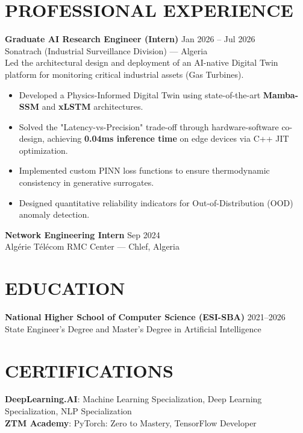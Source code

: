 \documentclass[a4paper,12pt]{article}
\begin{document}
\section{PROFESSIONAL EXPERIENCE}
\textbf{Graduate AI Research Engineer (Intern)} \hfill Jan 2026 -- Jul 2026 \\
Sonatrach (Industrial Surveillance Division) — Algeria \\
Led the architectural design and deployment of an AI-native Digital Twin platform for monitoring critical industrial assets (Gas Turbines). 
\begin{itemize}
    \item Developed a Physics-Informed Digital Twin using state-of-the-art \textbf{Mamba-SSM} and \textbf{xLSTM} architectures.
    \item Solved the "Latency-vs-Precision" trade-off through hardware-software co-design, achieving \textbf{0.04ms inference time} on edge devices via C++ JIT optimization.
    \item Implemented custom PINN loss functions to ensure thermodynamic consistency in generative surrogates.
    \item Designed quantitative reliability indicators for Out-of-Distribution (OOD) anomaly detection.
\end{itemize}

\textbf{Network Engineering Intern} \hfill Sep 2024 \\
Algérie Télécom RMC Center — Chlef, Algeria

\section{EDUCATION}
\textbf{National Higher School of Computer Science (ESI-SBA)} \hfill 2021--2026 \\
State Engineer's Degree and Master’s Degree in Artificial Intelligence

\section{CERTIFICATIONS}
\textbf{DeepLearning.AI}: Machine Learning Specialization, Deep Learning Specialization, NLP Specialization \\
\textbf{ZTM Academy}: PyTorch: Zero to Mastery, TensorFlow Developer
\newpage
\end{document}
